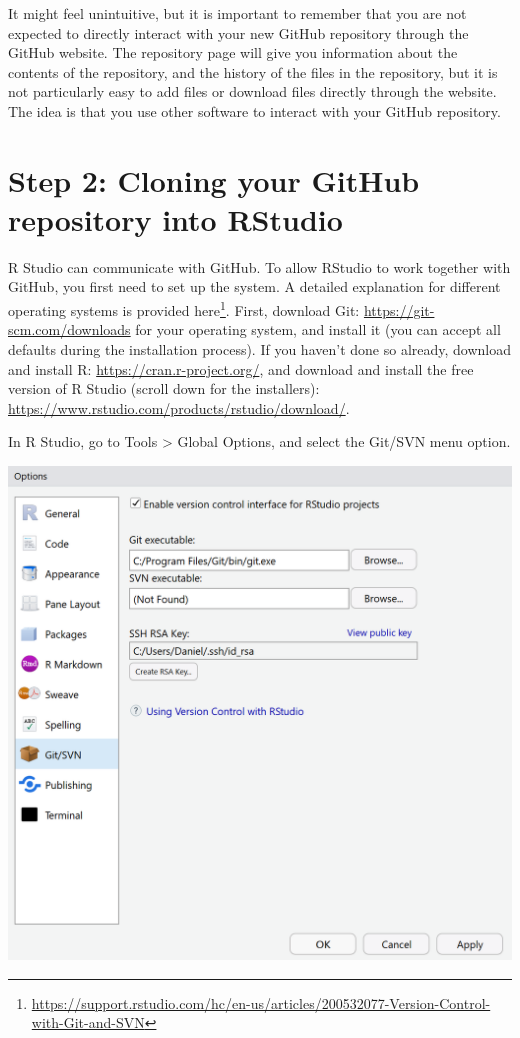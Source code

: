 \documentclass[
  oneside]{krantz}
\renewcommand{\href}[2]{#2\footnote{\url{#1}}}
\begin{document}
It might feel unintuitive, but it is important to remember that you are not
expected to directly interact with your new GitHub repository through the GitHub
website. The repository page will give you information about the contents of the
repository, and the history of the files in the repository, but it is not
particularly easy to add files or download files directly through the website.
The idea is that you use other software to interact with your GitHub repository.

\hypertarget{step-2-cloning-your-github-repository-into-rstudio}{%
\section{Step 2: Cloning your GitHub repository into RStudio}\label{step-2-cloning-your-github-repository-into-rstudio}}

R Studio can communicate with GitHub. To allow RStudio to work together with
GitHub, you first need to set up the system. A detailed explanation for
different operating systems is provided
\href{https://support.rstudio.com/hc/en-us/articles/200532077-Version-Control-with-Git-and-SVN}{here}.
First, download Git: \url{https://git-scm.com/downloads} for your operating system,
and install it (you can accept all defaults during the installation process). If
you haven't done so already, download and install R:
\url{https://cran.r-project.org/}, and download and install the free version of R
Studio (scroll down for the installers):
\url{https://www.rstudio.com/products/rstudio/download/}.

In R Studio, go to Tools \textgreater{} Global Options, and select the Git/SVN menu option.

\begin{center}\includegraphics[width=1\linewidth]{images/cfc1e6fc415fb90fad16f4856338b890} \end{center}
\end{document}
